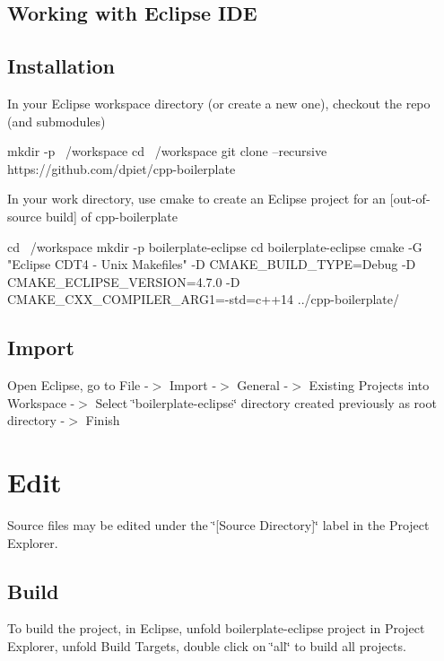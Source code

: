 \subsection*{Working with Eclipse I\+DE}

\subsection*{Installation}

In your Eclipse workspace directory (or create a new one), checkout the repo (and submodules) 
\begin{DoxyCode}
mkdir -p ~/workspace
cd ~/workspace
git clone --recursive https://github.com/dpiet/cpp-boilerplate
\end{DoxyCode}


In your work directory, use cmake to create an Eclipse project for an \mbox{[}out-\/of-\/source build\mbox{]} of cpp-\/boilerplate


\begin{DoxyCode}
cd ~/workspace
mkdir -p boilerplate-eclipse
cd boilerplate-eclipse
cmake -G "Eclipse CDT4 - Unix Makefiles" -D CMAKE\_BUILD\_TYPE=Debug -D CMAKE\_ECLIPSE\_VERSION=4.7.0 -D
       CMAKE\_CXX\_COMPILER\_ARG1=-std=c++14 ../cpp-boilerplate/
\end{DoxyCode}


\subsection*{Import}

Open Eclipse, go to File -\/$>$ Import -\/$>$ General -\/$>$ Existing Projects into Workspace -\/$>$ Select \char`\"{}boilerplate-\/eclipse\char`\"{} directory created previously as root directory -\/$>$ Finish

\section*{Edit}

Source files may be edited under the \char`\"{}\mbox{[}\+Source Directory\mbox{]}\char`\"{} label in the Project Explorer.

\subsection*{Build}

To build the project, in Eclipse, unfold boilerplate-\/eclipse project in Project Explorer, unfold Build Targets, double click on \char`\"{}all\char`\"{} to build all projects.

